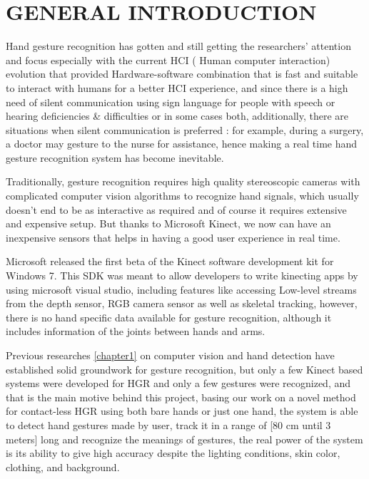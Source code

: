 \chapter*{GENERAL  INTRODUCTION} 


Hand gesture recognition  has gotten and still getting the researchers' attention and focus especially with the current HCI ( Human computer interaction) evolution that provided Hardware-software  combination that is fast and suitable to interact with humans for a better HCI experience, and since there is a high need of silent communication using sign language for people with speech or  hearing  deficiencies \& difficulties or in some cases both, additionally, there are situations when silent communication is preferred : for example, during a surgery,  a doctor may gesture to the nurse for assistance, hence making a real time  hand gesture recognition system has become inevitable.

Traditionally, gesture recognition requires high quality stereoscopic cameras with complicated computer vision algorithms to recognize hand signals, which usually doesn't end to be as interactive as required and of course it requires extensive and expensive setup. But thanks to Microsoft  Kinect, we now can have  an inexpensive  sensors  that helps in having a good user experience in real time.

Microsoft released the first beta of the Kinect software development kit for Windows 7. This SDK was meant to allow developers to write kinecting apps by using microsoft visual studio, including features like accessing Low-level streams from the depth sensor, RGB camera sensor   as well as skeletal  tracking, however,  there  is no hand  specific  data  available for  gesture   recognition,   although    it   includes   information  of the  joints   between  hands   and  arms.

Previous   researches  \ref{chapter1}  on  computer   vision  and hand   detection   have established   solid  groundwork    for gesture recognition, but  only  a  few  Kinect based   systems  were  developed   for  HGR    and  only  a  few  gestures were recognized, and that is  the main motive behind this project, basing our work on a novel method for contact-less HGR using both bare hands or just  one hand, the system is able to detect hand gestures  made by user, track it  in a range of [80 cm until 3 meters] long  and  recognize the meanings of gestures, the real power of the system is its ability to give high accuracy  despite the lighting  conditions,  skin color, clothing,  and background.

